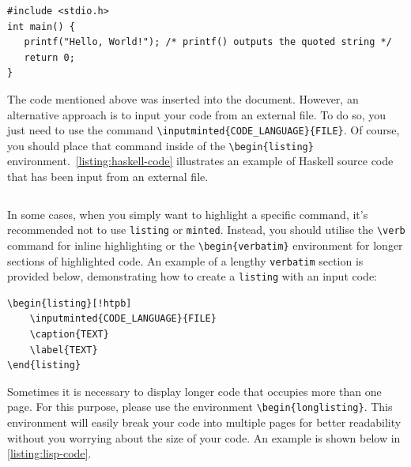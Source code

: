 \begin{listing}[!htpb]
    \caption{Hello world in C.}
    \label{listing:c-code}
    \begin{verbatim}
#include <stdio.h>
int main() {
   printf("Hello, World!"); /* printf() outputs the quoted string */
   return 0;
}
\end{verbatim}
\end{listing}

The code mentioned above was inserted into the document. However, an alternative approach is to input your code from an external file. To do so, you just need to use the command \verb|\inputminted{CODE_LANGUAGE}{FILE}|. Of course, you should place that command inside of the \verb|\begin{listing}| environment.\ \autoref{listing:haskell-code} illustrates an example of Haskell source code that has been input from an external file.

\begin{listing}[!htpb]
    \caption{Factorial in Haskell.}
    \label{listing:haskell-code}
    \inputminted{haskell}{Code/Factorial.hs}
\end{listing}

In some cases, when you simply want to highlight a specific command, it's recommended not to use \verb|listing| or \verb|minted|. Instead, you should utilise the \verb|\verb| command for inline highlighting or the \verb|\begin{verbatim}| environment for longer sections of highlighted code. An example of a lengthy \verb|verbatim| section is provided below, demonstrating how to create a \verb|listing| with an input code:

\begin{verbatim}
\begin{listing}[!htpb]
    \inputminted{CODE_LANGUAGE}{FILE}
    \caption{TEXT}
    \label{TEXT}
\end{listing}
\end{verbatim}

Sometimes it is necessary to display longer code that occupies more than one page. For this purpose, please use the environment \verb|\begin{longlisting}|. This environment will easily break your code into multiple pages for better readability without you worrying about the size of your code. An example is shown below in \autoref{listing:lisp-code}.

